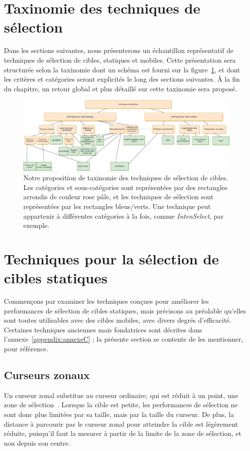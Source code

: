 \section{Taxinomie des techniques de sélection}
	Dans les sections suivantes, nous présenterons un échantillon représentatif de techniques de sélection de cibles, statiques et mobiles. Cette présentation sera structurée selon la taxinomie dont un schéma est fourni sur la figure~\ref{fig:selTaxi}, et dont les critères et catégories seront explicités le long des sections suivantes. À la fin du chapitre, un retour global et plus détaillé sur cette taxinomie sera proposé.	
	
\begin{landscape}
	\begin{figure}
		\centering
		\includegraphics[width=\linewidth]{figures/ch2/selTechTree}
		\caption[Taxinomie des techniques de sélection de cibles]{Notre proposition de taxinomie des techniques de sélection de cibles. Les catégories et sous-catégories sont représentées par des rectangles arrondis de couleur rose pâle, et les techniques de sélection sont représentées par les rectangles bleus/verts. Une technique peut appartenir à différentes catégories à la fois, comme \emph{IntenSelect}, par exemple.}
		\label{fig:selTaxi}
	\end{figure}
\end{landscape}
	
\section{Techniques pour la sélection de cibles statiques}
	Commençons par examiner les techniques conçues pour améliorer les performances de sélection de cibles statiques, mais précisons au préalable qu'elles sont toutes utilisables avec des cibles mobiles, avec divers degrés d'efficacité. Certaines techniques anciennes mais fondatrices sont décrites dans l'annexe~\ref{appendix:annexeC} ; la présente section se contente de les mentionner, pour référence.

\subsection{Curseurs zonaux}
	Un curseur zonal substitue au curseur ordinaire, qui est réduit à un point, une zone de sélection~\cite{kabbash1995prince, worden1997making}. Lorsque la cible est petite, les performances de sélection ne sont donc plus limitées par sa taille, mais par la taille du curseur. De plus, la distance à parcourir par le curseur zonal pour atteindre la cible est légèrement réduite, puisqu'il faut la mesurer à partir de la limite de la zone de sélection, et non depuis son centre.
	
